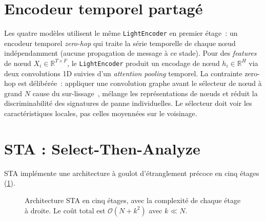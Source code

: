 \documentclass[a4paper,11pt,oneside]{report}
\begin{document}
\section{Encodeur temporel partag\'e}
\label{sec:methode-light-encoder}

Les quatre mod\`eles utilisent le m\^eme \texttt{LightEncoder} en premier \'etage~: un encodeur temporel \emph{zero-hop} qui traite la s\'erie temporelle de chaque nœud ind\'ependamment (aucune propagation de message \`a ce stade). Pour des \emph{features} de nœud $X_i \in \mathbb{R}^{T \times F}$, le \texttt{LightEncoder} produit un encodage de nœud $h_i \in \mathbb{R}^H$ via deux convolutions 1D suivies d'un \emph{attention pooling} temporel. La contrainte zero-hop est d\'elib\'er\'ee~: appliquer une convolution graphe avant le s\'electeur de nœud \`a grand $N$ cause du sur-lissage~\cite{li2018deepergcn}, m\'elange les repr\'esentations de nœuds et r\'eduit la discriminabilit\'e des signatures de panne individuelles. Le s\'electeur doit voir les caract\'eristiques locales, pas celles moyenn\'ees sur le voisinage.

\section{STA : Select-Then-Analyze}
\label{sec:methode-sta}

STA impl\'emente une architecture \`a goulot d'\'etranglement pr\'ecoce en cinq \'etages (\cref{fig:sta-5-etages}).

\begin{figure}[ht]
\centering
{}
\caption{Architecture STA en cinq \'etages, avec la complexit\'e de chaque \'etage \`a droite. Le co\^ut total est $\mathcal{O}(N + k^2)$ avec $k \ll N$.}
\label{fig:sta-5-etages}
\end{figure}
\end{document}
